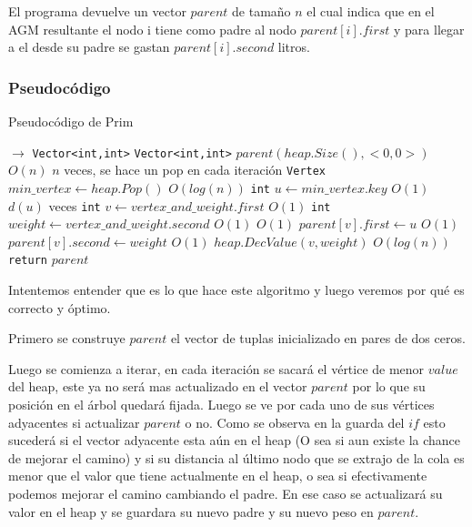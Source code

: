 El programa devuelve un vector $parent$ de tamaño $n$ el cual indica que en el AGM resultante el nodo i tiene como padre al nodo $parent[i].first$ y para llegar a el desde su padre se gastan $parent[i].second$ litros.

\subsubsection{Pseudocódigo}

\begin{algorithm}[H]
  \begin{algorithmic}[1]
  \caption{Pseudocódigo de Prim}
  \label{algo:2-2}
     $\rightarrow$ \texttt{Vector<int,int>}
    	\State \texttt{Vector<int,int>} $parent(heap.Size(), <0,0>)$
    	\Comment $O(n)$
    		\Comment $n$ veces, se hace un pop en cada iteración
    		\State \texttt{Vertex} $min\_vertex \gets heap.Pop()$
    		\Comment $O(log(n))$
    		\State \texttt{int} $ u \gets min\_vertex.key$
    		\Comment $O(1)$
    		\Comment $d(u)$ veces
	    		\State \texttt{int} $ v \gets vertex\_and\_weight.first$
	    		\Comment $O(1)$    			
	    		\State \texttt{int} $ weight \gets vertex\_and\_weight.second$
	    		\Comment $O(1)$    			
    			\Comment $O(1)$
    				\State $parent[v].first \gets u$
    				\Comment $O(1)$
    				\State $parent[v].second \gets weight$
    				\Comment $O(1)$
    				\State $heap.DecValue(v, weight)$
    				\Comment $O(log(n))$
    			\EndIf
    		\EndFor
    	\EndWhile
    	\State \texttt{return} $parent$
		\EndProcedure
	\end{algorithmic}
\end{algorithm}

Intentemos entender que es lo que hace este algoritmo y luego veremos por qué es correcto y óptimo.

Primero se construye $parent$ el vector de tuplas inicializado en pares de dos ceros. 

Luego se comienza a iterar, en cada iteración se sacará el v\'ertice de menor $value$ del heap, este ya no será mas actualizado en el vector $parent$ por lo que su posición en el árbol quedará fijada. Luego se ve por cada uno de sus v\'ertices adyacentes si actualizar $parent$ o no. Como se observa en la guarda del $if$ esto sucederá si el vector adyacente esta aún en el heap (O sea si aun existe la chance de mejorar el camino) y si su distancia al último nodo que se extrajo de la cola es menor
que el valor que tiene actualmente en el heap, o sea si efectivamente podemos mejorar el camino cambiando el padre. En ese caso se actualizará su valor en el heap y se guardara su nuevo padre y su nuevo peso en $parent$.

